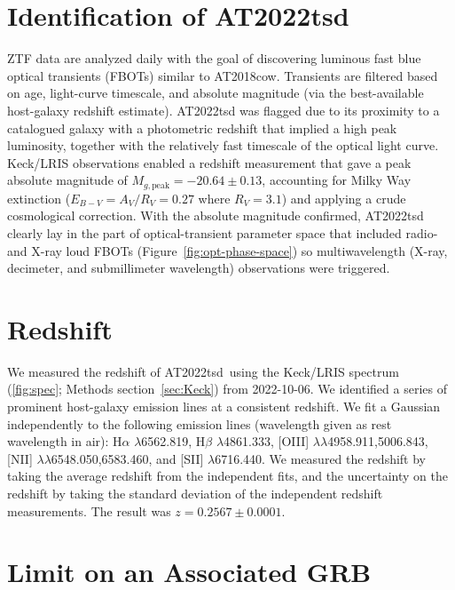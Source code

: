 \documentclass{nature_plusfigure}
\newcommand{\at}{AT2022tsd}
\begin{document}
\begin{methods}

\section{Identification of \at}
\label{Methods:Identification}

ZTF data are analyzed daily with the goal of discovering luminous fast blue optical transients (FBOTs) similar to AT2018cow\cite{Prentice2018}.
Transients are filtered based on age, light-curve timescale, and absolute magnitude (via the best-available host-galaxy redshift estimate).
AT2022tsd was flagged due to its proximity to a catalogued galaxy with a photometric redshift that implied a high peak luminosity, together with the relatively fast timescale of the optical light curve.
Keck/LRIS observations enabled a redshift measurement that gave a peak absolute magnitude of $M_{g, \mathrm{peak}}=-20.64\pm0.13$, accounting for Milky Way extinction ($E_{B-V}=A_V/R_V=0.27$ where $R_V=3.1$)\cite{Finkbeiner1999,Schlegel1998,Schlafly2011} and applying a crude cosmological correction.
With the absolute magnitude confirmed, AT2022tsd clearly lay in the part of optical-transient parameter space that included radio- and X-ray loud FBOTs (Figure~\ref{fig:opt-phase-space}) so
multiwavelength (X-ray, decimeter, and submillimeter wavelength) observations were triggered.

\section{Redshift}
\label{sec:redshift}

We measured the redshift of \at\ using the Keck/LRIS spectrum (\ref{fig:spec}; Methods section~\ref{sec:Keck}) from 2022-10-06.
We identified a series of prominent host-galaxy emission lines at a consistent redshift.
We fit a Gaussian independently to the following emission lines (wavelength given as rest wavelength in air): H$\alpha$ $\lambda$6562.819, H$\beta$ $\lambda$4861.333, 
 [OIII] $\lambda$$\lambda$4958.911,5006.843, 
  [NII] $\lambda$$\lambda$6548.050,6583.460, and [SII] $\lambda$6716.440. 
We measured the redshift by taking the average redshift from the independent fits, and the uncertainty on the redshift by taking the standard deviation of the independent redshift measurements.
The result was $z=0.2567\pm0.0001$.

\section{Limit on an Associated GRB}
\label{sec:grbsearch}


\end{methods}
\end{document}
